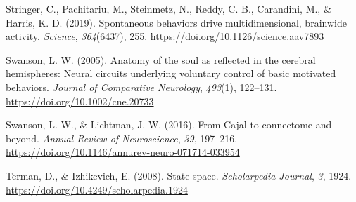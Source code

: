 \documentclass[
  letterpaper,
  DIV=11,
  numbers=noendperiod]{scrartcl}
\newlength{\cslhangindent}
\newenvironment{CSLReferences}[2] %
 {\begin{list}{}{%
  \setlength{\itemindent}{0pt}
  \setlength{\leftmargin}{0pt}
  \setlength{\parsep}{0pt}
  \ifodd #1
   \setlength{\leftmargin}{\cslhangindent}
   \setlength{\itemindent}{-1\cslhangindent}
  \fi
  \setlength{\itemsep}{#2\baselineskip}}}
 {\end{list}}
\begin{document}
\begin{CSLReferences}{1}{0}
Stringer, C., Pachitariu, M., Steinmetz, N., Reddy, C. B., Carandini,
M., \& Harris, K. D. (2019). Spontaneous behaviors drive
multidimensional, brainwide activity. \emph{Science}, \emph{364}(6437),
255. \url{https://doi.org/10.1126/science.aav7893}

Swanson, L. W. (2005). Anatomy of the soul as reflected in the cerebral
hemispheres: Neural circuits underlying voluntary control of basic
motivated behaviors. \emph{Journal of Comparative Neurology},
\emph{493}(1), 122--131. \url{https://doi.org/10.1002/cne.20733}

Swanson, L. W., \& Lichtman, J. W. (2016). From {C}ajal to connectome
and beyond. \emph{Annual Review of Neuroscience}, \emph{39}, 197--216.
\url{https://doi.org/10.1146/annurev-neuro-071714-033954}

Terman, D., \& Izhikevich, E. (2008). State space. \emph{Scholarpedia
Journal}, \emph{3}, 1924.
\url{https://doi.org/10.4249/scholarpedia.1924}

\end{CSLReferences}
\end{document}
